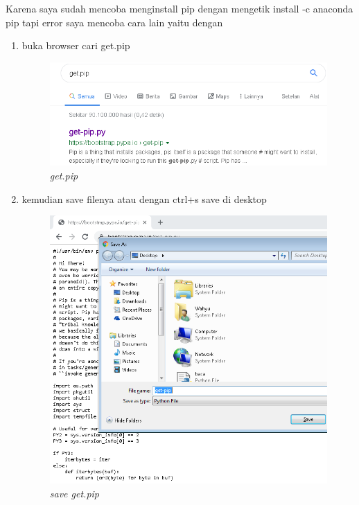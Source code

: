 \par Karena saya sudah mencoba menginstall pip dengan mengetik install -c anaconda pip tapi error saya mencoba cara lain yaitu dengan
\begin{enumerate}
\item buka browser cari get.pip
\begin{figure}[H]
    \centering
    \includegraphics[scale=0.5]{figures/b1}
    \caption{\textit{get.pip}}
    \label{getpip}
\end{figure}

\item kemudian save filenya atau dengan ctrl+s save di desktop
\begin{figure}[H]
    \centering
    \includegraphics[scale=0.5]{figures/b3}
    \caption{\textit{save get.pip}}
    \label{getpip}
\end{figure}


\end{enumerate}
